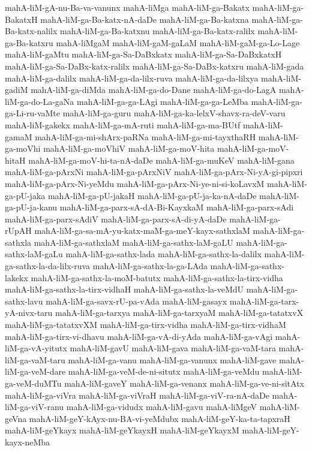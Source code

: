 {mahA-liM-gA-nu-Ba-va-vanunx
mahA-liMga
mahA-liM-ga-Bakatx
mahA-liM-ga-BakatxH
mahA-liM-ga-Ba-katx-nA-daDe
mahA-liM-ga-Ba-katxna
mahA-liM-ga-Ba-katx-nalilx
mahA-liM-ga-Ba-katxnu
mahA-liM-ga-Ba-katx-ralilx
mahA-liM-ga-Ba-katxru
mahA-liMgaM
mahA-liM-gaM-gaLaM
mahA-liM-gaM-ga-Lo-Lage
mahA-liM-gaMtu
mahA-liM-ga-Sa-DaBxkatx
mahA-liM-ga-Sa-DaBxkatxH
mahA-liM-ga-Sa-DaBx-katx-ralilx
mahA-liM-ga-Sa-DaBx-katxru
mahA-liM-gada
mahA-liM-ga-dalilx
mahA-liM-ga-da-lilx-ruva
mahA-liM-ga-da-lilxya
mahA-liM-gadiM
mahA-liM-ga-diMda
mahA-liM-ga-do-Dane
mahA-liM-ga-do-LagA
mahA-liM-ga-do-La-gaNa
mahA-liM-ga-ga-LAgi
mahA-liM-ga-ga-LeMba
mahA-liM-ga-ga-Li-ru-vaMte
mahA-liM-ga-guru
mahA-liM-ga-ka-lelxV-shavx-ra-deV-varu
mahA-liM-gakekx
mahA-liM-ga-mA-ruti
mahA-liM-ga-ma-BUtf
mahA-liM-gamaM
mahA-liM-ga-mi-shArx-paRNa
mahA-liM-ga-mi-tayxthaRH
mahA-liM-ga-moVhi
mahA-liM-ga-moVhiV
mahA-liM-ga-moV-hita
mahA-liM-ga-moV-hitaH
mahA-liM-ga-moV-hi-ta-nA-daDe
mahA-liM-ga-muKeV
mahA-liM-gana
mahA-liM-ga-pArxNi
mahA-liM-ga-pArxNiV
mahA-liM-ga-pArx-Ni-yA-gi-pipxri
mahA-liM-ga-pArx-Ni-yeMdu
mahA-liM-ga-pArx-Ni-ye-ni-si-koLavxM
mahA-liM-ga-pU-jaka
mahA-liM-ga-pU-jakaH
mahA-liM-ga-pU-ja-ka-nA-daDe
mahA-liM-ga-pU-ja-kanu
mahA-liM-ga-parx-sA-dA-Bi-KayxkaM
mahA-liM-ga-parx-sAdi
mahA-liM-ga-parx-sAdiV
mahA-liM-ga-parx-sA-di-yA-daDe
mahA-liM-ga-rUpAH
mahA-liM-ga-sa-mA-yu-katx-maM-ga-meY-kayx-sathxlaM
mahA-liM-ga-sathxla
mahA-liM-ga-sathxlaM
mahA-liM-ga-sathx-laM-gaLU
mahA-liM-ga-sathx-laM-gaLu
mahA-liM-ga-sathx-lada
mahA-liM-ga-sathx-la-dalilx
mahA-liM-ga-sathx-la-da-lilx-ruva
mahA-liM-ga-sathx-la-ga-LAda
mahA-liM-ga-sathx-lakekx
mahA-liM-ga-sathx-la-moM-batutx
mahA-liM-ga-sathx-la-tirx-vidha
mahA-liM-ga-sathx-la-tirx-vidhaH
mahA-liM-ga-sathx-la-veMdU
mahA-liM-ga-sathx-lavu
mahA-liM-ga-savx-rU-pa-vAda
mahA-liM-gasayx
mahA-liM-ga-tarx-yA-nivx-taru
mahA-liM-ga-tarxya
mahA-liM-ga-tarxyaM
mahA-liM-ga-tatatxvX
mahA-liM-ga-tatatxvXM
mahA-liM-ga-tirx-vidha
mahA-liM-ga-tirx-vidhaM
mahA-liM-ga-tirx-vi-dhavu
mahA-liM-ga-vA-di-yAda
mahA-liM-ga-vAgi
mahA-liM-ga-vA-yitutx
mahA-liM-gavU
mahA-liM-gava
mahA-liM-ga-vaM-tara
mahA-liM-ga-vaM-taru
mahA-liM-ga-vanu
mahA-liM-ga-vanunx
mahA-liM-gave
mahA-liM-ga-veM-dare
mahA-liM-ga-veM-de-ni-situtx
mahA-liM-ga-veMdu
mahA-liM-ga-veM-duMTu
mahA-liM-gaveY
mahA-liM-ga-venanx
mahA-liM-ga-ve-ni-sitAtx
mahA-liM-ga-viVra
mahA-liM-ga-viVraH
mahA-liM-ga-viV-ra-nA-daDe
mahA-liM-ga-viV-ranu
mahA-liM-ga-vidudx
mahA-liM-gavu
mahA-liMgeV
mahA-liM-geVna
mahA-liM-geY-kAyx-nu-BA-vi-yeMdubx
mahA-liM-geY-ka-ta-tapxraH
mahA-liM-geYkayx
mahA-liM-geYkayxH
mahA-liM-geYkayxM
mahA-liM-geY-kayx-neMba
}
